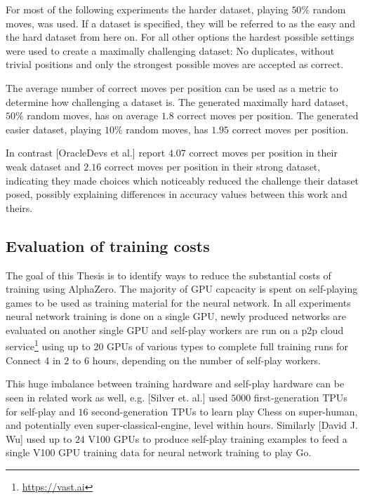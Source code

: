 \documentclass[12pt,onecolumn,oneside,titlepage]{article}
\begin{document}
For most of the following experiments the harder dataset, playing $50\%$ random moves, was used. If a dataset is specified, they will be referred to as the easy and the hard dataset from here on.
For all other options the hardest possible settings were used to create a maximally challenging dataset:
No duplicates, without trivial positions and only the strongest possible moves are accepted as correct.

The average number of correct moves per position can be used as a metric to determine how challenging a dataset is. The generated maximally hard dataset, $50\%$ random moves, has on average $1.8$ correct moves per position.
The generated easier dataset, playing $10\%$ random moves, has $1.95$ correct moves per position.

In contrast \cite{oracledevs}[OracleDevs et al.] report $4.07$ correct moves per position in their weak dataset and $2.16$ correct moves per position in their strong dataset, indicating they made choices which noticeably reduced the challenge their dataset posed, 
possibly explaining differences in accuracy values between this work and theirs.

\subsection{Evaluation of training costs}

The goal of this Thesis is to identify ways to reduce the substantial costs of training using AlphaZero. The majority of GPU capcacity is spent on self-playing games to be used as training material for the neural network.
In all experiments neural network training is done on a single GPU, newly produced networks are evaluated on another single GPU and self-play workers are run on a p2p cloud service\footnote{\url{https://vast.ai}} using up to 20 GPUs of various types to complete full training runs
for Connect 4 in $2$ to $6$ hours, depending on the number of self-play workers.

This huge imbalance between training hardware and self-play hardware can be seen in related work as well, e.g. \cite{AlphaZero}[Silver et. al.] used $5000$ first-generation TPUs for self-play and $16$ second-generation TPUs 
to learn play Chess on super-human, and potentially even super-classical-engine, level within hours. Similarly \cite{wu2019accelerating}[David J. Wu] used up to $24$ V100 GPUs to produce self-play training examples to feed a single V100 GPU training data for neural network training to play Go.
\end{document}
